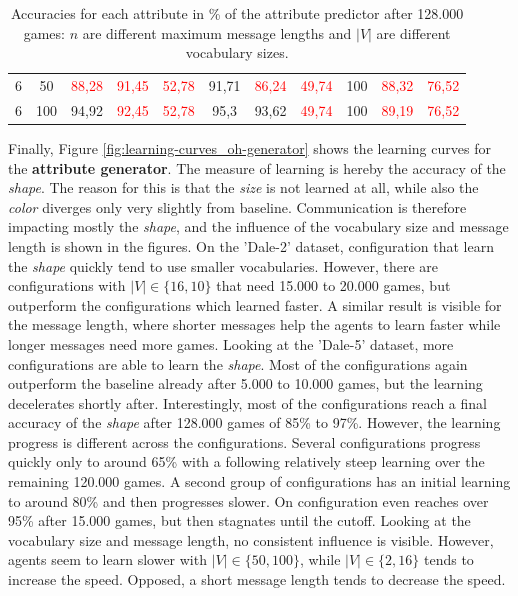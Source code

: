 \begin{table}[ht]
\begin{tabular}{cc|ccc|ccc|ccc}
        {6}                           & {50}    & \textcolor{red}{88,28}              & \textcolor{red}{91,45}              & \textcolor{red}{52,78}                   & {91,71}                         & \textcolor{red}{86,24}          & \textcolor{red}{49,74}         & {100}                           & \textcolor{red}{88,32}          & \textcolor{red}{76,52}         \\
        {6}                           & {100}   & {94,92}                             & \textcolor{red}{92,45}              & \textcolor{red}{52,78}                   & {95,3}                          & {93,62}                         & \textcolor{red}{49,74}         & {100}                           & \textcolor{red}{89,19}          & \textcolor{red}{76,52}         \\
        \bottomrule
    \end{tabular}
    \caption{Accuracies for each attribute in \% of the attribute predictor after 128.000 games: $n$ are different maximum message lengths and $|V|$ are different vocabulary sizes.}
    \label{tab:results:attribute-predictor-game}
\end{table}

Finally, Figure \ref{fig:learning-curves_oh-generator} shows the learning curves for the \textbf{attribute generator}.
The measure of learning is hereby the accuracy of the \emph{shape}.
The reason for this is that the \emph{size} is not learned at all, while also the \emph{color} diverges only very slightly from baseline.
Communication is therefore impacting mostly the \emph{shape}, and the influence of the vocabulary size and message length is shown in the figures.
On the 'Dale-2' dataset, configuration that learn the \emph{shape} quickly tend to use smaller vocabularies.
However, there are configurations with $|V| \in \{16,10\}$ that need 15.000 to 20.000 games, but outperform the configurations which learned faster.
A similar result is visible for the message length, where shorter messages help the agents to learn faster while longer messages need more games.
Looking at the 'Dale-5' dataset, more configurations are able to learn the \emph{shape}.
Most of the configurations again outperform the baseline already after 5.000 to 10.000 games, but the learning decelerates shortly after.
Interestingly, most of the configurations reach a final accuracy of the \emph{shape} after 128.000 games of 85\% to 97\%.
However, the learning progress is different across the configurations.
Several configurations progress quickly only to around 65\% with a following relatively steep learning over the remaining 120.000 games.
A second group of configurations has an initial learning to around 80\% and then progresses slower.
On configuration even reaches over 95\% after 15.000 games, but then stagnates until the cutoff.
Looking at the vocabulary size and message length, no consistent influence is visible.
However, agents seem to learn slower with $|V| \in \{50,100\}$, while $|V| \in \{2,16\}$ tends to increase the speed.
Opposed, a short message length tends to decrease the speed.

